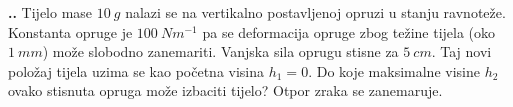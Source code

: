 
\noindent 
\textbf{
\thecjelina.\thezadatak.}
Tijelo mase $10\ g$ nalazi se na vertikalno postavljenoj opruzi u stanju ravnoteže. Konstanta
opruge je $100\ Nm^{-1}$
 pa se deformacija opruge zbog težine tijela (oko $1\ mm$) može slobodno
zanemariti. Vanjska sila oprugu stisne za $5\ cm$. Taj novi položaj tijela uzima se kao početna
visina $h_1 = 0$. Do koje maksimalne visine $h_2$ ovako stisnuta opruga može izbaciti tijelo? Otpor zraka se zanemaruje.

